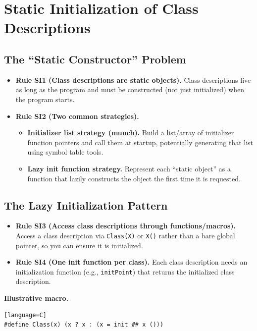 \documentclass[11pt]{article}
\begin{document}
\section{Static Initialization of Class Descriptions}

\subsection{The ``Static Constructor'' Problem}

\begin{itemize}
  \item \textbf{Rule SI1 (Class descriptions are static objects).} Class descriptions live as long as the program and must be constructed (not just initialized) when the program starts.
  \item \textbf{Rule SI2 (Two common strategies).}
  \begin{itemize}
    \item \textbf{Initializer list strategy (munch).} Build a list/array of initializer function pointers and call them at startup, potentially generating that list using symbol table tools.
    \item \textbf{Lazy init function strategy.} Represent each ``static object'' as a function that lazily constructs the object the first time it is requested.
  \end{itemize}
\end{itemize}

\subsection{The Lazy Initialization Pattern}

\begin{itemize}
  \item \textbf{Rule SI3 (Access class descriptions through functions/macros).} Access a class description via \texttt{Class(X)} or \texttt{X()} rather than a bare global pointer, so you can ensure it is initialized.
  \item \textbf{Rule SI4 (One init function per class).} Each class description needs an initialization function (e.g., \texttt{initPoint}) that returns the initialized class description.
\end{itemize}

\noindent\textbf{Illustrative macro.}
\begin{verbatim}[language=C]
#define Class(x) (x ? x : (x = init ## x ()))
\end{verbatim}
\end{document}
